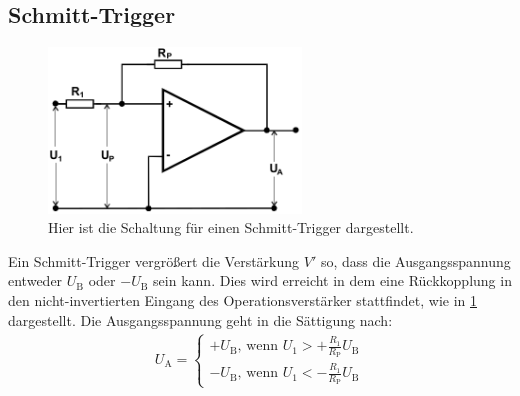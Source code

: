 \subsection{Schmitt-Trigger}
\label{sec:Schmitt}
\begin{figure}[h!]
	\centering
	\includegraphics[width = 0.6\textwidth]{../Grafiken/Schmitt-Trigger.png}
	\caption{Hier ist die Schaltung für einen Schmitt-Trigger dargestellt. \cite{V51}\label{fig:Schmitt-Trigger}}
\end{figure}
\noindent
Ein Schmitt-Trigger vergrößert die Verstärkung $V'$ so, dass die Ausgangsspannung entweder $U_\text{B}$ oder $-U_\text{B}$ sein kann.
Dies wird erreicht in dem eine Rückkopplung in den nicht-invertierten Eingang des Operationsverstärker stattfindet, wie in \cref{fig:Schmitt-Trigger} dargestellt.
Die Ausgangsspannung geht in die Sättigung nach:
\begin{align}
	U_\text{A}=
	\begin{cases}
		+U_\text{B}\text{, wenn } U_1 > +\frac{R_1}{R_\text{P}}U_\text{B} \\
		-U_\text{B}\text{, wenn } U_1 < -\frac{R_1}{R_\text{P}}U_\text{B}
	\end{cases}\label{eq:kippspannug}
\end{align}
